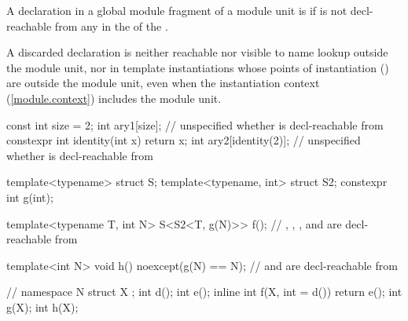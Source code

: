 \begin{std.txt}
\pnum
A declaration  in a global module fragment of a module unit
is  if 
is not decl-reachable from any 
in the 
of the .
\begin{note}
A discarded declaration is neither reachable
nor visible to name lookup outside the module unit,
nor in template instantiations whose points of instantiation
() are outside the module unit,
even when the instantiation context (\ref{module.context})
includes the module unit.
\end{note}

\pnum
\begin{example}
\begin{codeblock}
const int size = 2;
int ary1[size];                 // unspecified whether  is decl-reachable from 
constexpr int identity(int x) { return x; }
int ary2[identity(2)];          // unspecified whether  is decl-reachable from 

template<typename> struct S;
template<typename, int> struct S2;
constexpr int g(int);

template<typename T, int N>
S<S2<T, g(N)>> f();             // , , , and \tcode{::} are decl-reachable from 

template<int N>
void h() noexcept(g(N) == N);   //  and \tcode{::} are decl-reachable from 
\end{codeblock}
\end{example}

\pnum
\begin{example}
\begin{codeblock}
// 
namespace N {
  struct X {};
  int d();
  int e();
  inline int f(X, int = d()) { return e(); }
  int g(X);
  int h(X);
}


\end{codeblock}
\end{example}
\end{std.txt}

